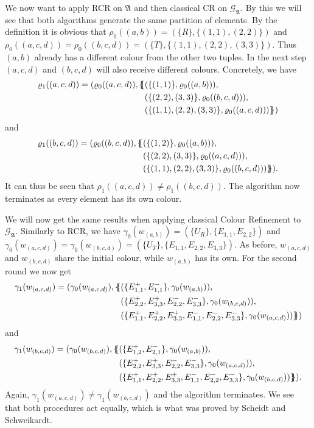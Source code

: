 We now want to apply RCR on $\mathfrak A$ and then classical CR on $\mathcal{G}_{\mathfrak A}$.
By this we will see that both algorithms generate the same partition of elements.
By the definition it is obvious that $\rho_0((a,b))=(\{R\},\{(1,1),(2,2)\})$ and $\rho_0((a,c,d))=\rho_0((b,c,d))=(\{T\}, \{(1,1),(2,2),(3,3)\})$.
Thus $(a,b)$ already has a different colour from the other two tuples.
In the next step $(a,c,d)$ and $(b,c,d)$ will also receive different colours.
Concretely, we have
\begin{align*}
	\varrho_1((a,c,d))=(\varrho_0((a,c,d)), \{\kern-.35em\{
		&(\{(1,1)\}, \varrho_0((a,b))), \\
		&(\{(2,2),(3,3)\}, \varrho_0((b,c,d))), \\
		&(\{(1,1),(2,2),(3,3)\}, \varrho_0((a,c,d)))
	\}\kern-.35em\})
\end{align*}
and
\begin{align*}
	\varrho_1((b,c,d))=(\varrho_0((b,c,d)), \{\kern-.35em\{ 
		&(\{(1,2)\}, \varrho_0((a,b))), \\
		&(\{(2,2),(3,3)\}, \varrho_0((a,c,d))), \\
		&(\{(1,1),(2,2),(3,3)\}, \varrho_0((b,c,d)))
	\}\kern-.35em\}).
\end{align*}
It can thus be seen that $\rho_1((a,c,d))\neq \rho_1((b,c,d))$.
The algorithm now terminates as every element has its own colour.

We will now get the same results when applying classical Colour Refinement to $\mathcal{G}_{\mathfrak A}$.
Similarly to RCR, we have $\gamma_0(w_{(a,b)})=(\{U_R\}, \{E_{1,1},E_{2,2}\})$ and $\gamma_0(w_{(a,c,d)})=\gamma_0(w_{(b,c,d)})=(\{U_T\}, \{E_{1,1},E_{2,2},E_{3,3}\})$.
As before, $w_{(a,c,d)}$ and $w_{(b,c,d)}$ share the initial colour, while $w_{(a,b)}$ has its own.
For the second round we now get 
\begin{align*}
	\gamma_1(w_{(a,c,d)})=(\gamma_0(w_{(a,c,d)}), \{\kern-.35em\{
		&(\{E_{1,1}^+,E_{1,1}^-\}, \gamma_0(w_{(a,b)})), \\
		&(\{E_{2,2}^+,E_{3,3}^+, E_{2,2}^-, E_{3,3}^-\}, \gamma_0(w_{(b,c,d)})), \\
		&(\{E_{1,1}^+,E_{2,2}^+,E_{3,3}^+,E_{1,1}^-,E_{2,2}^-,E_{3,3}^-\}, \gamma_0(w_{(a,c,d)}))
	\}\kern-.35em\})
\end{align*}
and
\begin{align*}
	\gamma_1(w_{(b,c,d)})=(\gamma_0(w_{(b,c,d)}), \{\kern-.35em\{
	&(\{E_{1,2}^+,E_{2,1}^-\}, \gamma_0(w_{(a,b)})), \\
	&(\{E_{2,2}^+,E_{3,3}^+, E_{2,2}^-, E_{3,3}^-\}, \gamma_0(w_{(a,c,d)})), \\
	&(\{E_{1,1}^+,E_{2,2}^+,E_{3,3}^+,E_{1,1}^-,E_{2,2}^-,E_{3,3}^-\}, \gamma_0(w_{(b,c,d)}))
	\}\kern-.35em\}).
\end{align*}
Again, $\gamma_1(w_{(a,c,d)})\neq \gamma_1(w_{(b,c,d)})$ and the algorithm terminates.
We see that both procedures act equally, which is what was proved by Scheidt and Schweikardt.

